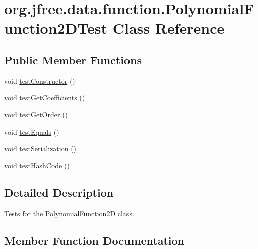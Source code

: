 \hypertarget{classorg_1_1jfree_1_1data_1_1function_1_1_polynomial_function2_d_test}{}\section{org.\+jfree.\+data.\+function.\+Polynomial\+Function2\+D\+Test Class Reference}
\label{classorg_1_1jfree_1_1data_1_1function_1_1_polynomial_function2_d_test}
\subsection*{Public Member Functions}
\begin{DoxyCompactItemize}
\item 
void \mbox{\hyperlink{classorg_1_1jfree_1_1data_1_1function_1_1_polynomial_function2_d_test_a03c0f57d25c24616630901217849a18e}{test\+Constructor}} ()
\item 
void \mbox{\hyperlink{classorg_1_1jfree_1_1data_1_1function_1_1_polynomial_function2_d_test_a09620d3be94e8490a591ab41482ad636}{test\+Get\+Coefficients}} ()
\item 
void \mbox{\hyperlink{classorg_1_1jfree_1_1data_1_1function_1_1_polynomial_function2_d_test_aedee922750defb78e6a2766f03e10b25}{test\+Get\+Order}} ()
\item 
void \mbox{\hyperlink{classorg_1_1jfree_1_1data_1_1function_1_1_polynomial_function2_d_test_a00d33a1289291158f1993526a1c2c1b4}{test\+Equals}} ()
\item 
void \mbox{\hyperlink{classorg_1_1jfree_1_1data_1_1function_1_1_polynomial_function2_d_test_abf331d810021ebe70f609f91d9b5f4b6}{test\+Serialization}} ()
\item 
void \mbox{\hyperlink{classorg_1_1jfree_1_1data_1_1function_1_1_polynomial_function2_d_test_a351a10188b9d538ddc0d74ca06c54ec7}{test\+Hash\+Code}} ()
\end{DoxyCompactItemize}


\subsection{Detailed Description}
Tests for the \mbox{\hyperlink{classorg_1_1jfree_1_1data_1_1function_1_1_polynomial_function2_d}{Polynomial\+Function2D}} class. 

\subsection{Member Function Documentation}
\mbox{\label{classorg_1_1jfree_1_1data_1_1function_1_1_polynomial_function2_d_test_a03c0f57d25c24616630901217849a18e}} 
